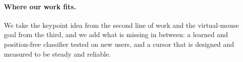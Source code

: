 \paragraph{Where our work fits.} We take the keypoint idea from the second
line of work and the virtual-mouse goal from the third, and we add what is
missing in between: a learned and position-free classifier tested on new
users, and a cursor that is designed and measured to be steady and reliable.
